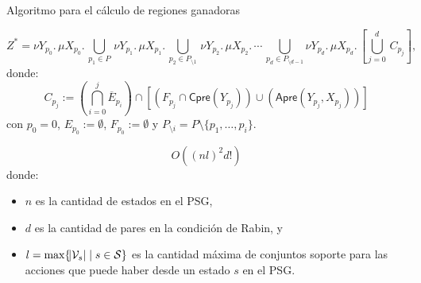 \documentclass{beamer}
\newcommand{\St}{\mathcal{S}}
\newcommand{\Vs}{\mathcal{V}_s}
\newcommand{\Cpre}{\textsf{Cpre}}
\newcommand{\Apre}{\textsf{Apre}}
\begin{document}
\begin{frame}{Algoritmo para el cálculo de regiones ganadoras}
	\pause

	{\footnotesize

		\[
			Z^* = \nu Y_{p_0}.\, \mu X_{p_0}.\, \bigcup_{p_1 \in P}\, \nu Y_{p_1}.\, \mu X_{p_1}.\, \bigcup_{p_2 \in P_{\setminus 1}}\, \nu Y_{p_2}.\, \mu X_{p_2} .\, \cdots\, \bigcup_{p_d \in P_{\setminus d-1}} \nu Y_{p_d}.\, \mu X_{p_d}.\, \left[ \bigcup_{j=0}^d\, C_{p_j} \right],
		\]
		donde:
		\[
			C_{p_j} := \left( \bigcap_{i=0}^j \overline{E}_{p_i} \right) \cap \left[ (F_{p_j} \cap \Cpre(Y_{p_j})) \cup (\Apre(Y_{p_j}, X_{p_j})) \right]
		\]
		con $p_0 = 0$, \( E_{p_0} := \emptyset \), $F_{p_0} := \emptyset$ y
		$P_{\setminus i} = P \setminus \{p_1, \dots, p_i\}$.

		\pause
		$$O((n l)^2 d!)$$
		\pause
		donde:
		\begin{itemize}
			\item $n$ es la cantidad de estados en el PSG,\pause
			\item $d$ es la cantidad de pares en la condici\'on de Rabin, y \pause
			\item $l = \max \{\abs{\Vs} \mid s \in \St \}$ es la cantidad máxima de conjuntos soporte para las acciones que puede haber desde un estado $s$ en el PSG.
		\end{itemize}
	}

\end{frame}
\end{document}
